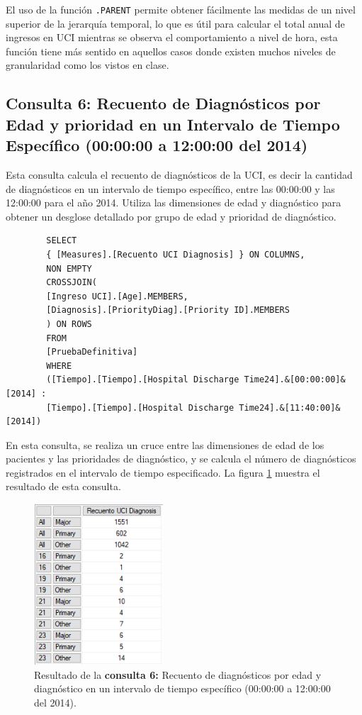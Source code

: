\documentclass[12pt, a4paper, twoside]{article}
\begin{document}
	El uso de la función \texttt{.PARENT} permite obtener fácilmente las medidas de un nivel superior de la jerarquía temporal, lo que es útil para calcular el total anual de ingresos en UCI mientras se observa el comportamiento a nivel de hora, esta función tiene más sentido en aquellos casos donde existen muchos niveles de granularidad como los vistos en clase.
	
	
	\subsection{Consulta 6: Recuento de Diagnósticos por Edad y prioridad en un Intervalo de Tiempo Específico (00:00:00 a 12:00:00 del 2014)}
	
	Esta consulta calcula el recuento de diagnósticos de la UCI, es decir la cantidad de diagnósticos en un intervalo de tiempo específico, entre las 00:00:00 y las 12:00:00 para el año 2014. Utiliza las dimensiones de edad y diagnóstico para obtener un desglose detallado por grupo de edad y prioridad de diagnóstico.
	
	\begin{verbatim}
		SELECT 
		{ [Measures].[Recuento UCI Diagnosis] } ON COLUMNS,
		NON EMPTY 
		CROSSJOIN(
		[Ingreso UCI].[Age].MEMBERS,
		[Diagnosis].[PriorityDiag].[Priority ID].MEMBERS
		) ON ROWS
		FROM 
		[PruebaDefinitiva]
		WHERE
		([Tiempo].[Tiempo].[Hospital Discharge Time24].&[00:00:00]&[2014] : 
		[Tiempo].[Tiempo].[Hospital Discharge Time24].&[11:40:00]&[2014])
	\end{verbatim}
	
	En esta consulta, se realiza un cruce entre las dimensiones de edad de los pacientes y las prioridades de diagnóstico, y se calcula el número de diagnósticos registrados en el intervalo de tiempo especificado. La figura \ref{fig:consulta6} muestra el resultado de esta consulta.
	
	\begin{figure}[H]
		\centering
		\includegraphics[width=0.43\textwidth]{image/consulta6.png}
		\caption{Resultado de la \textbf{consulta 6:}  Recuento de diagnósticos por edad y diagnóstico en un intervalo de tiempo específico (00:00:00 a 12:00:00 del 2014).}
		\label{fig:consulta6}
	\end{figure}
	
\end{document}
